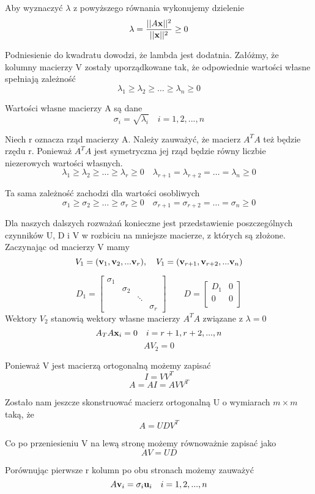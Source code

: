 \documentclass[12pt]{article}
\begin{document}
Aby wyznaczyć $\lambda$ z powyższego równania wykonujemy dzielenie
\[\lambda = \frac{||A\vb{x}||^2}{||\vb{x}||^2} \geq 0 \]

Podniesienie do kwadratu dowodzi, że lambda jest dodatnia. Załóżmy, że kolumny macierzy V zostały uporządkowane tak, że odpowiednie wartości własne spełniają zależność
\[\lambda_1 \geq \lambda_2 \geq \ldots \geq \lambda_n \geq 0 \]

Wartości własne macierzy A są dane
\[\sigma_i = \sqrt{\lambda_i} \quad i = 1, 2,..., n \]

Niech r oznacza rząd macierzy A. Należy zauważyć, że macierz $A^T A$ też będzie rzędu r. Ponieważ $A^T A$ jest symetryczna jej rząd będzie równy liczbie niezerowych wartości własnych.
\[\lambda_1 \geq \lambda_2 \geq \ldots \geq \lambda_r \geq 0 \quad \lambda_{r+1} = \lambda_{r+2} = \ldots = \lambda_n \geq 0 \]

Ta sama zależność zachodzi dla wartości osobliwych
\[\sigma_1 \geq \sigma_2 \geq \ldots \geq \sigma_r \geq 0 \quad \sigma_{r+1} = \sigma_{r+2} = \ldots = \sigma_n \geq 0 \]

Dla naszych dalszych rozważań konieczne jest przedstawienie poszczególnych czynników U, D i V  w rozbiciu na mniejsze macierze, z których są złożone. Zaczynając od macierzy V mamy
\[V_1 = (\vb{v}_1, \vb{v}_2,... \vb{v}_r), \quad V_1 = (\vb{v}_{r+1}, \vb{v}_{r+2},... \vb{v}_n) \]

\[
D_1 = \begin{bmatrix}
\sigma_1 & & & \\
& \sigma_2 & & \\
& & \ddots & \\
& & & \sigma_r
\end{bmatrix}
\qquad
D = \begin{bmatrix}
D_1 & 0 \\
0 & 0 \\
\end{bmatrix}
\]
Wektory $V_2$ stanowią wektory własne macierzy $A^T A$ związane z $\lambda = 0$
\[A_T A \vb{x}_i = 0 \quad i = r+1, r+2,..., n \]
\[AV_2 = 0 \]

Ponieważ V jest macierzą ortogonalną możemy zapisać
\[I = VV^T \]
\[A = AI = AVV^T \]

Zostało nam jeszcze skonstruować macierz ortogonalną U o wymiarach $m \times m$ taką, że
\[A = UDV^T \]

Co po przeniesieniu V na lewą stronę możemy równoważnie zapisać jako
\[AV = UD \]

Porównując pierwsze r kolumn po obu stronach możemy zauważyć
\[A \vb{v}_i = \sigma_i \vb{u}_i \quad i = 1, 2,..., n \]
\end{document}
